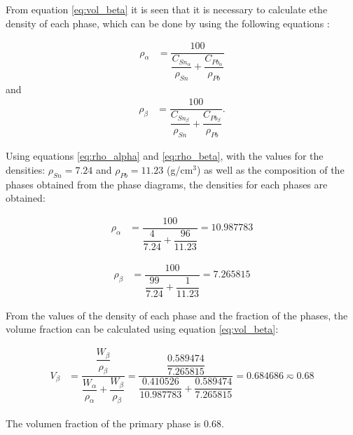 From equation \eqref{eq:vol_beta} it is seen that it is necessary to calculate ethe density of each phase, which can be done by using the following equations \citet{callister2010materials}:

\begin{align}
    \label{eq:rho_alpha}
    \rho_{\alpha}&=\dfrac{100}{\dfrac{C_{Sn_{\alpha}}}{\rho_{Sn}}+\dfrac{C_{Pb_{\alpha}}}{\rho_{Pb}}}
\end{align}
and
\begin{align}
    \label{eq:rho_beta}
    \rho_{\beta}&=\dfrac{100}{\dfrac{C_{Sn_{\beta}}}{\rho_{Sn}}+\dfrac{C_{Pb_{\beta}}}{\rho_{Pb}}}.
\end{align}

Using equations \eqref{eq:rho_alpha} and \eqref{eq:rho_beta}, with the values for the densities: $\rho_{Sn}=7.24$ and $\rho_{Pb}=11.23$ (g/cm$^3$) \citet{callister2010materials} as well as the composition of the phases obtained from the phase diagrams, the densities for each phases are obtained:

\begin{align}
    \label{eq:rho_alpha_num}
    \rho_{\alpha}&=\dfrac{100}{\dfrac{4}{7.24}+\dfrac{96}{11.23}}=10.987783
\end{align}

\begin{align}
    \label{eq:rho_beta_num}
    \rho_{\beta}&=\dfrac{100}{\dfrac{99}{7.24}+\dfrac{1}{11.23}}=7.265815
\end{align}

From the values of the density of each phase and the fraction of the phases, the volume fraction can be calculated using equation \eqref{eq:vol_beta}:

\begin{align}
    \label{eq:vol_beta_num}
    V_{\beta}&=\dfrac{\dfrac{W_{\beta}}{\rho_{\beta}}}{\dfrac{W_{\alpha}}{\rho_{\alpha}}+\dfrac{W_{\beta}}{\rho_{\beta}}}=\dfrac{\dfrac{0.589474}{7.265815}}{\dfrac{0.410526}{10.987783}+\dfrac{0.589474}{7.265815}}=0.684686\eqsim 0.68
\end{align}


\begin{mdframed}
The volumen fraction of the primary phase is 0.68.
\end{mdframed}

